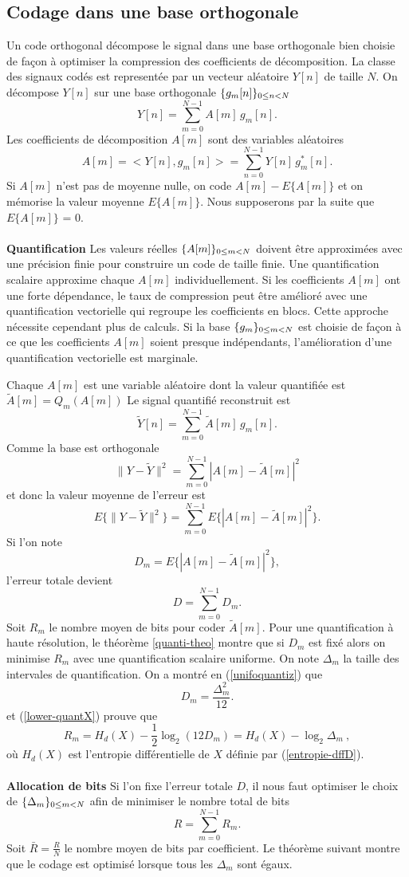 \subsection{Codage dans une base orthogonale}
\label{transf-sec}

Un code orthogonal d\'ecompose le signal dans une base
orthogonale bien choisie de fa\c con \`a optimiser la compression
des coefficients de d\'ecomposition.
La classe des signaux cod\'es est represent\'ee
par un vecteur al\'eatoire $Y[n]$ de taille $N$.
On d\'ecompose $Y[n]$ sur une
base orthogonale $\{ g_m [n] \}_{ 0 \leq n < N}$
\[
Y[n] = \sum_{m=0}^{N-1} A[m] \,g_m [n] .
\]
Les coefficients de d\'ecomposition
$A[m]$ sont des variables al\'eatoires
\[
A[m] = <Y[n] , g_m [n] > =
\sum_{n=0}^{N-1} Y[n] \, g^*_m [n] .
\]
Si $A[m]$ n'est pas de moyenne nulle,
on code $A[m] - E\{A[m]\}$ et on m\'emorise la valeur moyenne
$E\{A[m]\}$. Nous supposerons par la suite que
$E\{A[m]\}$ = 0.
\\
\\
{\bf Quantification}
Les valeurs r\'eelles
$\{A[m]\}_{ 0 \leq m < N}$ doivent \^etre approxim\'ees avec une pr\'ecision finie
pour construire un code de taille finie.
Une quantification scalaire approxime chaque
$A[m]$ individuellement.
Si les coefficients $A[m]$ ont une forte d\'ependance,
le taux de compression peut \^etre am\'elior\'e
avec une quantification vectorielle qui regroupe les coefficients
en blocs.
Cette approche n\'ecessite cependant plus de calculs.
Si la base $\{ g_m\}_{ 0 \leq m < N}$ est choisie de fa\c con \`a ce que
les coefficients $A[m]$ soient presque ind\'ependants,
l'am\'elioration d'une quantification vectorielle est
marginale.

Chaque $A[m]$ est une variable al\'eatoire dont la valeur
quantifi\'ee est $\tilde A[m] = Q_m (A[m])$
Le signal quantifi\'e reconstruit est
\[
\tilde Y[n] = \sum_{m=0}^{N-1} \tilde A[m] \, g_m [n] .
\]
Comme la base est orthogonale
\[
\| Y - \tilde Y \|^2 = \sum_{m=0}^{N-1}
|A[m] - \tilde A[m]|^2
\]
et donc la valeur moyenne de l'erreur est
\[
E\{\| Y - \tilde Y \|^2\} = \sum_{m=0}^{N-1}
E\{|A[m] - \tilde A[m]|^2\}.
\]
Si l'on note
\[
D_m = E\{|A[m] - \tilde A[m]|^2\} ,
\]
l'erreur totale devient
\[
D =  \sum_{m=0}^{N-1}  D_m .
\]
Soit $R_m$ le nombre moyen de bits pour coder $\tilde A [m]$.
Pour une quantification \`a haute r\'esolution,
le th\'eor\`eme \ref{quanti-theo} montre que si
$D_m$ est fix\'e alors on minimise
$R_m$ avec une quantification scalaire uniforme. On note $\Delta_m$
la taille des intervales de quantification. On a montr\'e en
(\ref{unifoquantiz}) que
\[
D_m = \frac {\Delta_m^2} {12} .
\]
et (\ref{lower-quantX}) prouve que
\[
R_m = H_d (X) -  \frac 1 2 \log_2 (12 D_m) =
H_d (X) -  \log_2 \Delta_m ~,
\]
o\`u $H_d (X)$ est l'entropie diff\'erentielle de $X$ d\'efinie
par (\ref{entropie-dffD}).
\\
\\
{\bf Allocation de bits}
Si l'on fixe l'erreur totale $D$, il nous faut
optimiser le choix de $\{\Delta_m\}_{ 0 \leq m < N}$
afin de minimiser le nombre total de bits
\[
R  = \sum_{m=0}^{N-1} R_m .
\]
Soit $\bar R = \frac R N$ le nombre moyen de bits par
coefficient.
Le th\'eor\`eme suivant montre que le codage est optimis\'e
lorsque tous les $\Delta_m$ sont \'egaux.


